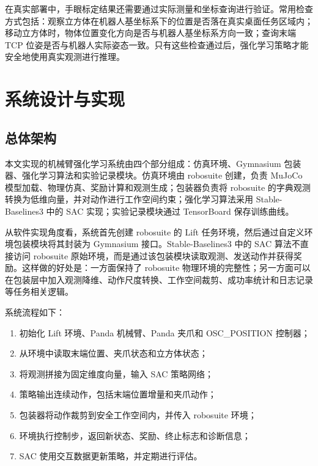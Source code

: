 \documentclass[
    type = bachelor,
    oneside,
    fontset = fandol
]{njuthesis}
\begin{document}
在真实部署中，手眼标定结果还需要通过实际测量和坐标查询进行验证。常用检查方式包括：观察立方体在机器人基坐标系下的位置是否落在真实桌面任务区域内；移动立方体时，物体位置变化方向是否与机器人基坐标系方向一致；查询末端 TCP 位姿是否与机器人实际姿态一致。只有这些检查通过后，强化学习策略才能安全地使用真实观测进行推理。

\chapter{系统设计与实现}

\section{总体架构}

本文实现的机械臂强化学习系统由四个部分组成：仿真环境、Gymnasium 包装器、强化学习算法和实验记录模块。仿真环境由 robosuite 创建，负责 MuJoCo 模型加载、物理仿真、奖励计算和观测生成；包装器负责将 robosuite 的字典观测转换为低维向量，并对动作进行工作空间约束；强化学习算法采用 Stable-Baselines3 中的 SAC 实现\cite{stablebaselines3}；实验记录模块通过 TensorBoard 保存训练曲线。

从软件实现角度看，系统首先创建 robosuite 的 Lift 任务环境，然后通过自定义环境包装模块将其封装为 Gymnasium 接口。Stable-Baselines3 中的 SAC 算法不直接访问 robosuite 原始环境，而是通过该包装模块读取观测、发送动作并获得奖励。这样做的好处是：一方面保持了 robosuite 物理环境的完整性；另一方面可以在包装层中加入观测降维、动作尺度转换、工作空间裁剪、成功率统计和日志记录等任务相关逻辑。


系统流程如下：
\begin{enumerate}
  \item 初始化 Lift 环境、Panda 机械臂、Panda 夹爪和 OSC\_POSITION 控制器；
  \item 从环境中读取末端位置、夹爪状态和立方体状态；
  \item 将观测拼接为固定维度向量，输入 SAC 策略网络；
  \item 策略输出连续动作，包括末端位置增量和夹爪动作；
  \item 包装器将动作裁剪到安全工作空间内，并传入 robosuite 环境；
  \item 环境执行控制步，返回新状态、奖励、终止标志和诊断信息；
  \item SAC 使用交互数据更新策略，并定期进行评估。
\end{enumerate}
\end{document}
